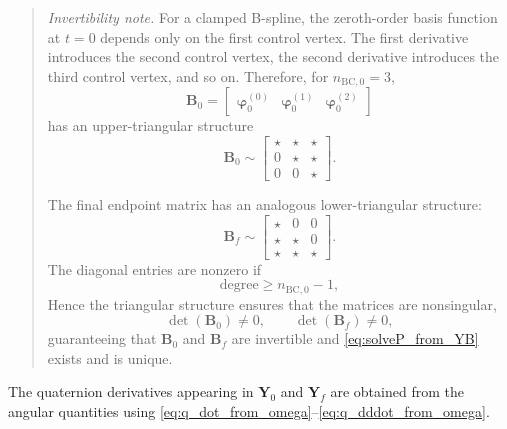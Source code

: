 \begin{quote} 
    \textit{Invertibility note.} For a clamped B-spline, the zeroth-order basis function at $t=0$ depends only on the first control vertex.
    The first derivative introduces the second control vertex, the second derivative introduces the third control vertex, and so on. 
    Therefore, for $n_{\mathrm{BC,0}}=3$, 
    \begin{equation} 
        \mathbf{B}_0 = 
        \begin{bmatrix}
            \boldsymbol{\varphi}^{(0)}_0 & \boldsymbol{\varphi}^{(1)}_0 &
            \boldsymbol{\varphi}^{(2)}_0 
        \end{bmatrix} 
    \end{equation} 
    has an upper-triangular structure 
    \begin{equation} 
        \mathbf{B}_0 \sim 
        \begin{bmatrix} 
            \star & \star & \star \\ 
            0 & \star & \star \\ 
            0 & 0 & \star 
        \end{bmatrix}. 
    \end{equation}

    The final endpoint matrix has an analogous lower-triangular structure:
    \begin{equation} 
        \mathbf{B}_f \sim 
        \begin{bmatrix} 
            \star & 0 & 0 \\ 
            \star & \star & 0 \\ 
            \star & \star & \star 
        \end{bmatrix}. 
    \end{equation}
    The diagonal entries are nonzero if 
    \begin{equation} 
        \text{degree} \geq n_{\mathrm{BC,0}}-1, 
    \end{equation} 
    Hence the triangular structure ensures that the matrices are nonsingular, 
    \begin{equation} 
        \det(\mathbf{B}_0)\neq 0, \qquad
        \det(\mathbf{B}_f)\neq 0, 
    \end{equation} 
    guaranteeing that $\mathbf{B}_0$ and $\mathbf{B}_f$ are invertible and \cref{eq:solveP_from_YB} exists and is unique.
\end{quote}

The quaternion derivatives appearing in $\mathbf{Y}_0$ and $\mathbf{Y}_f$ are obtained from the angular quantities using \cref{eq:q_dot_from_omega}--\cref{eq:q_dddot_from_omega}. 

